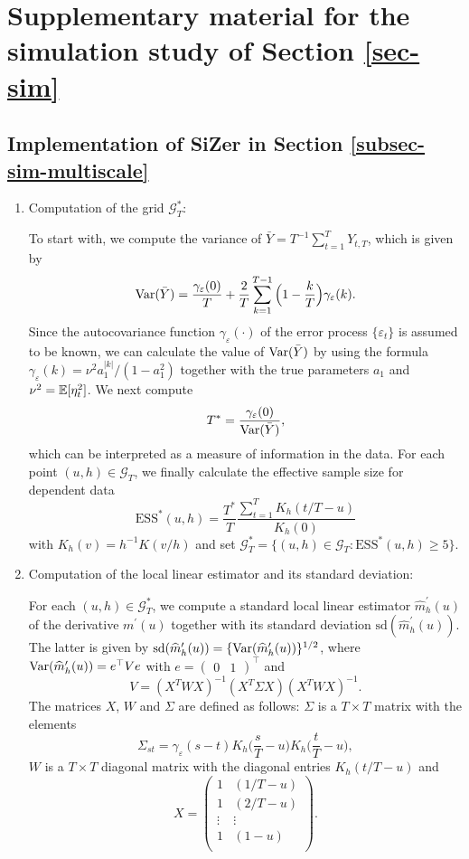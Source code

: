 
\section{Supplementary material for the simulation stu\-dy of Section \ref{sec-sim}}\label{sec-supp-sim}


\subsection*{Implementation of SiZer in Section \ref{subsec-sim-multiscale}}


\begin{enumerate}[leftmargin=0.7cm,label=(\alph*)]

\item Computation of the grid $\mathcal{G}_T^*$:

To start with, we compute the variance of $\bar{Y} = T^{-1} \sum_{t=1}^T Y_{t,T}$, which is given by
\[ \textnormal{Var}(\bar{Y}) = \frac{\gamma_\varepsilon(0)}{T} + \frac{2}{T} \sum_{k = 1}^{T-1} \Big(1 - \frac{k}{T}\Big)\gamma_\varepsilon(k). \]
Since the autocovariance function $\gamma_{\varepsilon}(\cdot)$ of the error process $\{\varepsilon_t\}$ is assumed to be known, we can calculate the value of $\textnormal{Var}(\bar{Y})$ by using the formula $\gamma_\varepsilon(k) = \nu^2 a_1^{|k|} / (1 - a_1^2)$ together with the true para\-meters $a_1$ and $\nu^2 = \mathbb{E}[\eta_t^2]$. We next compute 
\[ T^* = \frac{\gamma_\varepsilon(0)}{\textnormal{Var}(\bar{Y})}, \] 
which can be interpreted as a measure of information in the data. For each point $(u,h) \in \mathcal{G}_T$, we finally calculate the effective sample size for dependent data 
\[ \text{ESS}^*(u, h) = \frac{T^*}{T} \frac{\sum_{t=1}^T K_h(t/T - u)}{K_h(0)} \]
with $K_h(v) = h^{-1} K(v/h)$ and set $\mathcal{G}_T^* = \{ (u,h) \in \mathcal{G}_T: \text{ESS}^*(u, h) \ge 5 \}$. 

\item Computation of the local linear estimator and its standard deviation: 

For each $(u,h) \in \mathcal{G}_T^*$, we compute a standard local linear estimator $\widehat{m}^\prime_h(u)$ of the derivative $m^\prime(u)$ together with its standard deviation $\text{sd}(\widehat{m}^\prime_h(u))$. The latter is given by $\text{sd}(\widehat{m}^\prime_h(u)) = \{ \textnormal{Var}(\widehat{m}^\prime_h(u)) \}^{1/2}$, where $\textnormal{Var}(\widehat{m}^\prime_h(u)) = e^\top V e$ with $e = (\begin{matrix} 0 & 1 \end{matrix})^\top$ and 
\[ V = (X^T W X)^{-1} (X^T \Sigma X) (X^T W X)^{-1}. \]
The matrices $X$, $W$ and $\Sigma$ are defined as follows: $\Sigma$ is a $T \times T$ matrix with the elements
\[ \Sigma_{st} = \gamma_\varepsilon(s-t) K_h\Big( \frac{s}{T} - u \Big) K_h\Big( \frac{t}{T} - u \Big), \]
$W$ is a $T \times T$ diagonal matrix with the diagonal entries $K_h(t/T-u)$ and 
\[ X =   
\begin{pmatrix}
1 & (1/T - u)   \\
1 & (2/T - u)   \\
\vdots & \vdots \\
1 & (1 - u)     \\
\end{pmatrix}. \]


\end{enumerate}
